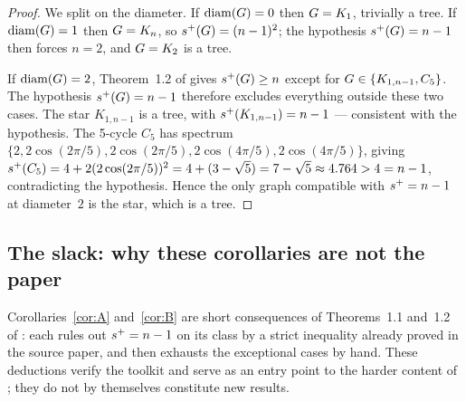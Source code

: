 \begin{proof}
We split on the diameter. If $\operatorname{diam}(G) = 0$ then $G = K_{1}$,
trivially a tree. If $\operatorname{diam}(G) = 1$ then $G = K_{n}$, so
$s^{+}(G) = (n - 1)^{2}$; the hypothesis
$s^{+}(G) = n - 1$ then forces $n = 2$, and $G = K_{2}$ is a
tree.

If $\operatorname{diam}(G) = 2$, Theorem~1.2 of \cite{AKMPZ2025} gives
$s^{+}(G) \ge n$ except for $G \in \{K_{1, n-1}, C_{5}\}$.
The hypothesis $s^{+}(G) = n - 1$ therefore excludes everything
outside these two cases. The star $K_{1, n-1}$ is a tree, with
$s^{+}(K_{1, n-1}) = n - 1$ — consistent with the hypothesis. The
5-cycle $C_{5}$ has spectrum
$\{2, 2\cos(2\pi/5), 2\cos(2\pi/5), 2\cos(4\pi/5), 2\cos(4\pi/5)\}$,
giving $s^{+}(C_{5}) = 4 + 2(2\cos(2\pi/5))^{2} = 4 + (3 - \sqrt{5})
= 7 - \sqrt{5} \approx 4.764 > 4 = n - 1$, contradicting the hypothesis. Hence
the only graph compatible with $s^{+} = n - 1$ at diameter~$2$ is the
star, which is a tree.
\end{proof}

\subsection{The slack: why these corollaries are not the paper}
\label{sec:notation:slack}

Corollaries~\ref{cor:A} and~\ref{cor:B} are short consequences of
Theorems~1.1 and~1.2 of \cite{AKMPZ2025}: each rules out
$s^{+} = n - 1$ on its class by a strict inequality already proved in
the source paper, and then exhausts the exceptional cases by hand.
These deductions verify the toolkit and serve as an entry point to the
harder content of ; they
do not by themselves constitute new results.
